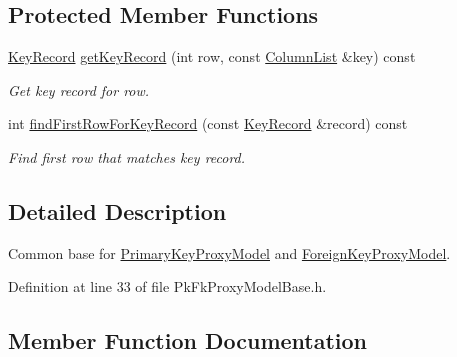 \subsection*{Protected Member Functions}
\begin{DoxyCompactItemize}
\item 
\hyperlink{class_mdt_1_1_item_model_1_1_key_record}{Key\+Record} \hyperlink{class_mdt_1_1_item_model_1_1_pk_fk_proxy_model_base_abd0ab0772251670482fd935f6e3c72a7}{get\+Key\+Record} (int row, const \hyperlink{class_mdt_1_1_item_model_1_1_column_list}{Column\+List} \&key) const 
\begin{DoxyCompactList}\small\item\em Get key record for row. \end{DoxyCompactList}\item 
int \hyperlink{class_mdt_1_1_item_model_1_1_pk_fk_proxy_model_base_a4351563a94c85b165670a72e87f54bcf}{find\+First\+Row\+For\+Key\+Record} (const \hyperlink{class_mdt_1_1_item_model_1_1_key_record}{Key\+Record} \&record) const 
\begin{DoxyCompactList}\small\item\em Find first row that matches key record. \end{DoxyCompactList}\end{DoxyCompactItemize}


\subsection{Detailed Description}
Common base for \hyperlink{class_mdt_1_1_item_model_1_1_primary_key_proxy_model}{Primary\+Key\+Proxy\+Model} and \hyperlink{class_mdt_1_1_item_model_1_1_foreign_key_proxy_model}{Foreign\+Key\+Proxy\+Model}. 

Definition at line 33 of file Pk\+Fk\+Proxy\+Model\+Base.\+h.



\subsection{Member Function Documentation}
